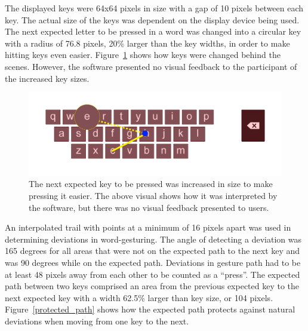 The displayed keys were 64x64 pixels in size with a gap of 10 pixels between each key. The actual size of the keys was dependent on the display device being used. The next expected letter to be pressed in a word was changed into a circular key with a radius of 76.8 pixels, 20\% larger than the key widths, in order to make hitting keys even easier. Figure~\ref{key_bloating} shows how keys were changed behind the scenes. However, the software presented no visual feedback to the participant of the increased key sizes.

\begin{figure}[!t]
	\centering
	\includegraphics[width=5in]{Figures/fig_bloat_key}
	\caption[Larger Key Example]{The next expected key to be pressed was increased in size to make pressing it easier. The above visual shows how it was interpreted by the software, but there was no visual feedback presented to users.}
	\label{key_bloating}
\end{figure}

An interpolated trail with points at a minimum of 16 pixels apart was used in determining deviations in word-gesturing. The angle of detecting a deviation was 165 degrees for all areas that were not on the expected path to the next key and was 90 degrees while on the expected path. Deviations in gesture path had to be at least 48 pixels away from each other to be counted as a ``press''. The expected path between two keys comprised an area from the previous expected key to the next expected key with a width 62.5\% larger than key size, or 104 pixels. Figure~\ref{protected_path} shows how the expected path protects against natural deviations when moving from one key to the next.

